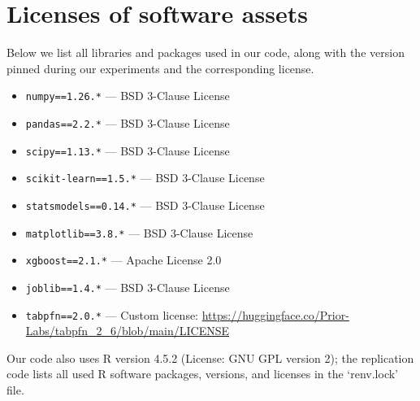 \section{Licenses of software assets}
\label{appendix:licenses}

Below we list all libraries and packages used in our code, along with the version pinned during our experiments and the corresponding license.

\begin{itemize}
    \item \texttt{numpy==1.26.*} --- BSD 3-Clause License
    \item \texttt{pandas==2.2.*} --- BSD 3-Clause License
    \item \texttt{scipy==1.13.*} --- BSD 3-Clause License
    \item \texttt{scikit-learn==1.5.*} --- BSD 3-Clause License
    \item \texttt{statsmodels==0.14.*} --- BSD 3-Clause License
    \item \texttt{matplotlib==3.8.*} --- BSD 3-Clause License
    \item \texttt{xgboost==2.1.*} --- Apache License 2.0
    \item \texttt{joblib==1.4.*} --- BSD 3-Clause License
    \item \texttt{tabpfn==2.0.*} --- Custom license: \url{https://huggingface.co/Prior-Labs/tabpfn_2_6/blob/main/LICENSE}
\end{itemize}

Our code also uses R version 4.5.2 (License: GNU GPL version 2); the replication code lists all used R software packages, versions, and licenses in the `renv.lock' file.